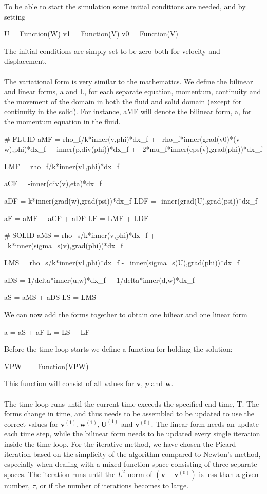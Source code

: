 To be able to start the simulation some initial conditions are needed, and by setting
\begin{cverbatim}
U = Function(W)
v1 = Function(V)
v0 = Function(V)
\end{cverbatim}
The initial conditions are simply set to be zero both for velocity and displacement.
\\
\\
The variational form is very similar to the mathematics. We define the bilinear and linear forms, a and L, for each separate equation, momentum, continuity and the movement of the domain in both the fluid and solid domain (except for continuity in the solid). For instance, aMF will denote the bilinear form, a, for the momentum equation in the fluid.
\begin{cverbatim}
# FLUID
aMF = rho_f/k*inner(v,phi)*dx_f + \
	rho_f*inner(grad(v0)*(v-w),phi)*dx_f - \
	 inner(p,div(phi))*dx_f + \
	2*mu_f*inner(eps(v),grad(phi))*dx_f

LMF = rho_f/k*inner(v1,phi)*dx_f

aCF = -inner(div(v),eta)*dx_f

aDF = k*inner(grad(w),grad(psi))*dx_f
LDF = -inner(grad(U),grad(psi))*dx_f

aF = aMF + aCF + aDF
LF = LMF + LDF

# SOLID
aMS = rho_s/k*inner(v,phi)*dx_f + \
	k*inner(sigma_s(v),grad(phi))*dx_f

LMS = rho_s/k*inner(v1,phi)*dx_f - \
	inner(sigma_s(U),grad(phi))*dx_f

aDS = 1/delta*inner(u,w)*dx_f - \
	1/delta*inner(d,w)*dx_f


aS = aMS + aDS
LS = LMS

\end{cverbatim}
We can now add the forms together to obtain one biliear and one linear form
\begin{cverbatim}
a = aS + aF 
L = LS + LF
\end{cverbatim}
Before the time loop starts we define a function for holding the solution:
\begin{cverbatim}
VPW_ = Function(VPW)
\end{cverbatim}
This function will consist of all values for $\mathbf{v}$, $p$ and $\mathbf{w}$.
\\
\\
The time loop runs until the current time exceeds the specified end time, T. The forms change in time, and thus needs to be assembled to be updated to use the correct values for $\mathbf{v}^{(1)}, \mathbf{w}^{(1)}, \mathbf{U}^{(1)}$ and $\mathbf{v}^{(0)}$. The linear form needs an update each time step, while the bilinear form needs to be updated every single iteration inside the time loop. For the iterative method, we have chosen the Picard iteration based on the simplicity of the algorithm compared to Newton's method, especially when dealing with a mixed function space consisting of three separate spaces. The iteration runs until the $L^2$ norm of $(\mathbf{v}-\mathbf{v}^{(0)})$ is less than a given number, $\tau$, or if the number of iterations becomes to large. 


